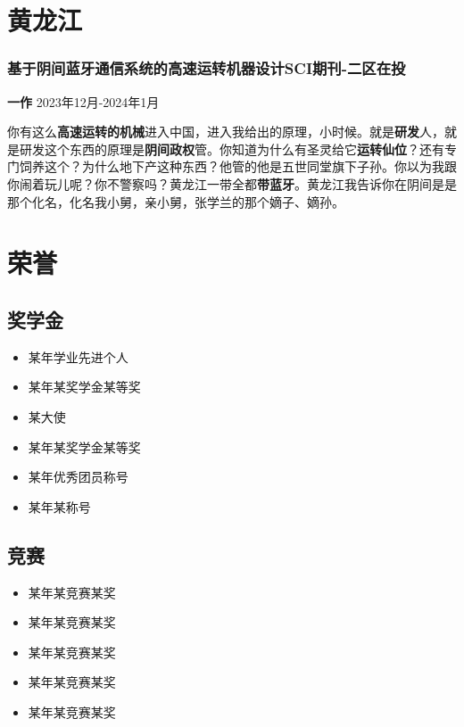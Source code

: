 \documentclass{cv}
\begin{document}
\section[\faBluetooth]{黄龙江}

\subsubsection{基于阴间蓝牙通信系统的高速运转机器设计\hfill SCI期刊-二区在投}

\textbf{一作} \hfill 2023年12月-2024年1月

你有这么\textbf{高速运转的机械}进入中国，进入我给出的原理，小时候。就是\textbf{研发}人，就是研发这个东西的原理是\textbf{阴间政权}管。你知道为什么有圣灵给它\textbf{运转仙位}？还有专门饲养这个？为什么地下产这种东西？他管的他是五世同堂旗下子孙。你以为我跟你闹着玩儿呢？你不警察吗？黄龙江一带全都\textbf{带蓝牙}。黄龙江我告诉你在阴间是是那个化名，化名我小舅，亲小舅，张学兰的那个嫡子、嫡孙。

\section[\faAward]{荣誉}

\subsection{奖学金}

\begin{multicols}{2}
	\begin{itemize}
		\item 某年学业先进个人
		\item 某年某奖学金某等奖
		\item 某大使
		\item 某年某奖学金某等奖
		\item 某年优秀团员称号
		\item 某年某称号
	\end{itemize}
\end{multicols}

\subsection{竞赛}

\begin{itemize}
	\item 某年某竞赛某奖
	\item 某年某竞赛某奖
	\item 某年某竞赛某奖
	\item 某年某竞赛某奖
	\item 某年某竞赛某奖
\end{itemize}
\end{document}
